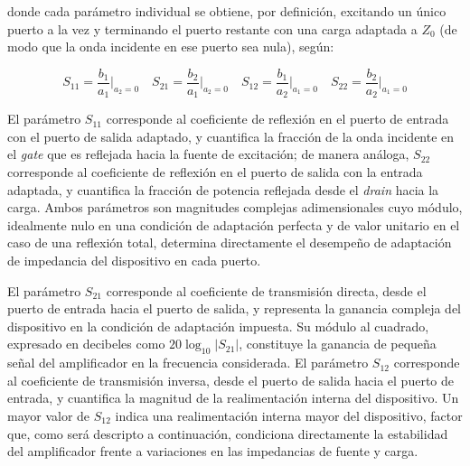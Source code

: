 donde cada parámetro individual se obtiene, por definición, excitando un único puerto a la vez y terminando el puerto restante con una carga adaptada a $Z_0$ (de modo que la onda incidente en ese puerto sea nula), según:

\begin{equation}
    S_{11} = \frac{b_1}{a_1}\bigg|_{a_2 = 0} \quad
    S_{21} = \frac{b_2}{a_1}\bigg|_{a_2 = 0} \quad
    S_{12} = \frac{b_1}{a_2}\bigg|_{a_1 = 0} \quad
    S_{22} = \frac{b_2}{a_2}\bigg|_{a_1 = 0}
    \label{eq:definicion_s}
\end{equation}

El parámetro $S_{11}$ corresponde al coeficiente de reflexión en el puerto de entrada con el puerto de salida adaptado, y cuantifica la fracción de la onda incidente en el \textit{gate} que es reflejada hacia la fuente de excitación; de manera análoga, $S_{22}$ corresponde al coeficiente de reflexión en el puerto de salida con la entrada adaptada, y cuantifica la fracción de potencia reflejada desde el \textit{drain} hacia la carga. Ambos parámetros son magnitudes complejas adimensionales cuyo módulo, idealmente nulo en una condición de adaptación perfecta y de valor unitario en el caso de una reflexión total, determina directamente el desempeño de adaptación de impedancia del dispositivo en cada puerto.

El parámetro $S_{21}$ corresponde al coeficiente de transmisión directa, desde el puerto de entrada hacia el puerto de salida, y representa la ganancia compleja del dispositivo en la condición de adaptación impuesta. Su módulo al cuadrado, expresado en decibeles como $20\log_{10}|S_{21}|$, constituye la ganancia de pequeña señal del amplificador en la frecuencia considerada. El parámetro $S_{12}$ corresponde al coeficiente de transmisión inversa, desde el puerto de salida hacia el puerto de entrada, y cuantifica la magnitud de la realimentación interna del dispositivo. Un mayor valor de $S_{12}$ indica una realimentación interna mayor del dispositivo, factor que, como será descripto a continuación, condiciona directamente la estabilidad del amplificador frente a variaciones en las impedancias de fuente y carga.

